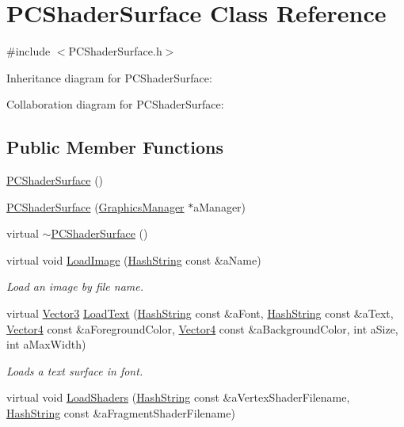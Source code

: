 \hypertarget{classPCShaderSurface}{}\section{P\+C\+Shader\+Surface Class Reference}
\label{classPCShaderSurface}


{\ttfamily \#include $<$P\+C\+Shader\+Surface.\+h$>$}



Inheritance diagram for P\+C\+Shader\+Surface\+:


Collaboration diagram for P\+C\+Shader\+Surface\+:
\subsection*{Public Member Functions}
\begin{DoxyCompactItemize}
\item 
\hyperlink{classPCShaderSurface_a3dc1eb67279811b9ac78cd3d98ce3768}{P\+C\+Shader\+Surface} ()
\item 
\hyperlink{classPCShaderSurface_ab20ce43690d22c9da363607d3e01b6cd}{P\+C\+Shader\+Surface} (\hyperlink{classGraphicsManager}{Graphics\+Manager} $\ast$a\+Manager)
\item 
virtual \hyperlink{classPCShaderSurface_aca50515bcfb2d55d8627639c36a5f920}{$\sim$\+P\+C\+Shader\+Surface} ()
\item 
virtual void \hyperlink{classPCShaderSurface_a174eb5f22b5502263d69f13948da226a}{Load\+Image} (\hyperlink{classHashString}{Hash\+String} const \&a\+Name)
\begin{DoxyCompactList}\small\item\em Load an image by file name. \end{DoxyCompactList}\item 
virtual \hyperlink{structVector3}{Vector3} \hyperlink{classPCShaderSurface_a199474fdbdac125b9abb8b00cd56d844}{Load\+Text} (\hyperlink{classHashString}{Hash\+String} const \&a\+Font, \hyperlink{classHashString}{Hash\+String} const \&a\+Text, \hyperlink{structVector4}{Vector4} const \&a\+Foreground\+Color, \hyperlink{structVector4}{Vector4} const \&a\+Background\+Color, int a\+Size, int a\+Max\+Width)
\begin{DoxyCompactList}\small\item\em Loads a text surface in font. \end{DoxyCompactList}\item 
virtual void \hyperlink{classPCShaderSurface_a89d0b3e19f210afbe3edee6be389dbe9}{Load\+Shaders} (\hyperlink{classHashString}{Hash\+String} const \&a\+Vertex\+Shader\+Filename, \hyperlink{classHashString}{Hash\+String} const \&a\+Fragment\+Shader\+Filename)

\end{DoxyCompactItemize}
